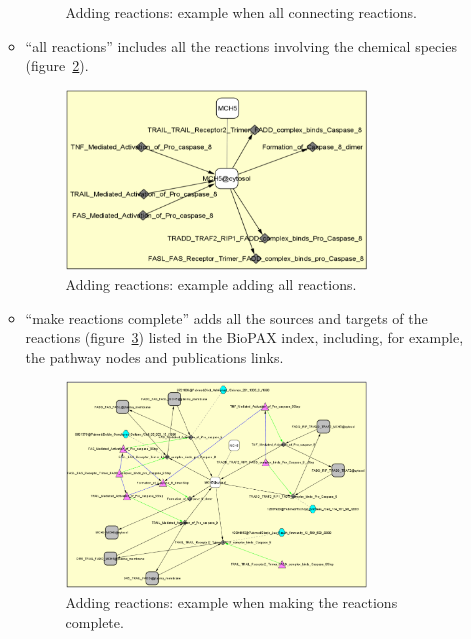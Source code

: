 \begin{itemize}
\begin{itemize}
\begin{figure}[h]
\caption{Adding reactions: example when all connecting reactions.}
\label{Standard_Query_All_connecting_reactions}
\end{figure}
\item “all reactions” includes all the reactions involving the chemical species (figure~\ref{Standard_Query_Adding_all_reactions}).
\begin{figure}[h]
\centering
\includegraphics[width=0.8\textwidth]{graphics/Standard_Query_Adding_all_reactions}
\caption{Adding reactions: example adding all reactions.}
\label{Standard_Query_Adding_all_reactions}
\end{figure}
\item “make reactions complete” adds all the sources and targets of the reactions (figure~\ref{Standard_Query_Making_reactions_complete}) listed in the BioPAX index, including, for example, the pathway nodes and publications links.
\begin{figure}[h]
\centering
\includegraphics[width=0.8\textwidth]{graphics/Standard_Query_Making_reactions_complete}
\caption{Adding reactions: example when making the reactions complete.}
\label{Standard_Query_Making_reactions_complete}
\end{figure}
\end{itemize}

\end{itemize}
